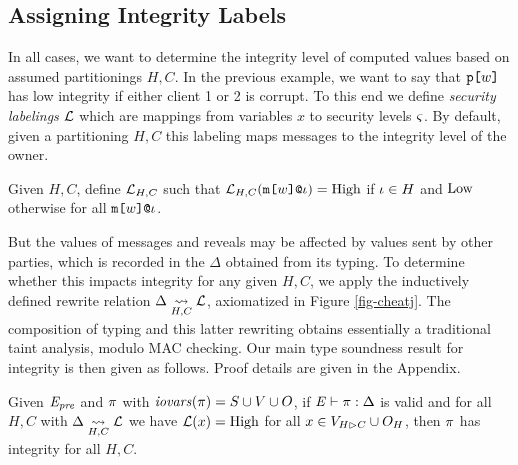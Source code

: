 \cheatjfig

\subsection{Assigning Integrity Labels}

In all cases, we want to determine the integrity level of computed
values based on assumed partitionings $H,C$. In the previous example,
we want to say that $\texttt{p[}w\texttt{]}$ has low integrity if either client 1 or
2 is corrupt.  To this end we define \emph{security labelings}
$\mathcal{L}$ which are mappings from variables $x$ to security levels
$\varsigma$. By default, given a partitioning $H,C$ this labeling maps
messages to the integrity level of the owner.
\begin{definition}  
  Given $H,C$,
  define $\mathcal{L}_{H,C}$ such that $\mathcal{L}_{H,C}(\texttt{m[}w\texttt{]}\texttt{@}\iota ) = \mathrm{High}$
  if $\iota \in H$  and $\mathrm{Low}$
  otherwise for all $\texttt{m[}w\texttt{]}\texttt{@}\iota$.
\end{definition}
But the values of messages and reveals may be affected by values sent
by other parties, which is recorded in the $\Delta$ obtained from its
typing. To determine whether this impacts integrity for any given
$H,C$, we apply the inductively defined rewrite relation
$\Delta \underset{H,C}{\leadsto} \mathcal{L}$, axiomatized in Figure
\ref{fig-cheatj}. The composition of typing and this latter rewriting
obtains essentially a traditional taint analysis, modulo MAC checking.
Our main type soundness result for integrity is then given as follows.
Proof details are given in the Appendix.
\begin{theorem}
  \label{theorem-ipj}
  Given  $\mathit{E}_{\mathit{pre}}$ and $\pi$ with
  $\mathit{iovars}(\pi) = S \cup V \cup O$, if
  $\mathit{E} \vdash \pi : \Delta$ is valid
  and for all $H,C$ with $\Delta \underset{H,C}{\leadsto} \mathcal{L}$ 
  we have $\mathcal{L}(x) = \mathrm{High}$ for all $x \in V_{H \rhd C} \cup O_H$, then $\pi$
  has integrity for all $H,C$.
\end{theorem}
